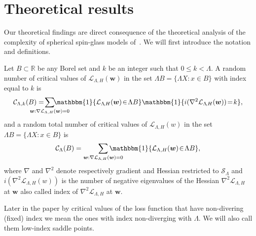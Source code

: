 \documentclass[twoside]{article}
\begin{document}
\section{Theoretical results}
\label{sec:theory}
Our theoretical findings are direct consequence of the theoretical analysis of the complexity of spherical spin-glass models of~\cite{AAC2010}. We will first introduce the notation and definitions. 
\begin{definition}
Let $B \subset \mathbb{R}$ be any Borel set and $k$ be an integer such that $0 \leq k < \Lambda$. A random number of critical values of $\mathcal{L}_{\Lambda,H}({\bm w})$ in the set $\Lambda B = \{\Lambda X:x\in B\}$ with index equal to $k$ is
\[\mathcal{C}_{\Lambda,k}(B) = \!\!\!\!\!\!\!\!\!\!\!\!\!\!\sum_{{\bm w}:\nabla \mathcal{L}_{\Lambda,H}({\bm w}) = 0}\!\!\!\!\!\!\!\!\!\!\!\!\!\!\!\mathbbm{1}\{\mathcal{L}_{\Lambda\!,H}({\bm w})\!\in\! \Lambda B\}\mathbbm{1}\{i(\nabla^2\mathcal{L}_{\Lambda\!,H}({\bm w})) \!=\! k\},
\]
and a random total number of critical values of $\mathcal{L}_{\Lambda,H}(w)$ in the set $\Lambda B = \{\Lambda X:x\in B\}$ is
\[\mathcal{C}_{\Lambda}(B) = \sum_{{\bm w}:\nabla \mathcal{L}_{\Lambda,H}({\bm w}) = 0}\!\!\!\!\!\!\!\!\!\!\!\!\!\mathbbm{1}\{\mathcal{L}_{\Lambda,H}({\bm w})\!\in\! \Lambda B\},
\]
where $\nabla$ and $\nabla^2$ denote respectively gradient and Hessian restricted to $\mathcal{S}_{\Lambda}$ and $i(\nabla^2\mathcal{L}_{\Lambda,H}(w))$ is the number of negative eigenvalues of the Hessian $\nabla^2\mathcal{L}_{\Lambda,H}$ at ${\bm w}$ also called index of $\nabla^2\mathcal{L}_{\Lambda,H}$ at ${\bm w}$.
\end{definition}
Later in the paper by critical values of the loss function that have non-divering (fixed) index we mean the ones with index non-diverging with $\Lambda$. We will also call them low-index saddle points.
\end{document}
